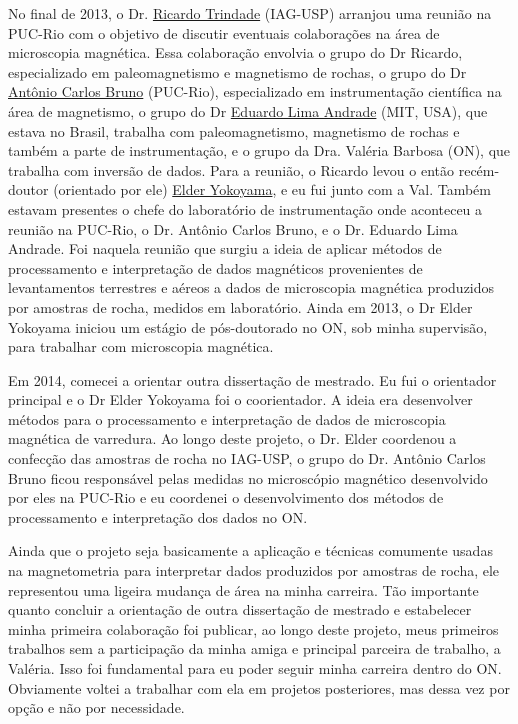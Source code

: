 No final de 2013, o Dr. \href{https://lattes.cnpq.br/3934334115083849}{Ricardo Trindade} (IAG-USP) arranjou uma reunião na
PUC-Rio com o objetivo de discutir eventuais colaborações na área de microscopia
magnética. Essa colaboração envolvia o grupo do Dr Ricardo, especializado em
paleomagnetismo e magnetismo de rochas, o grupo do Dr \href{https://lattes.cnpq.br/8840926029509231}{Antônio Carlos Bruno}
(PUC-Rio), especializado em instrumentação científica na área de magnetismo,
o grupo do Dr \href{https://eapsweb.mit.edu/people/limaea}{Eduardo Lima Andrade} (MIT, USA), que estava no Brasil, trabalha com paleomagnetismo,
magnetismo de rochas e também a parte de instrumentação, e o grupo da Dra. Valéria
Barbosa (ON), que trabalha com inversão de dados.
Para a reunião, o Ricardo levou o então recém-doutor (orientado por ele)
\href{https://lattes.cnpq.br/9806242954314478}{Elder Yokoyama}, e eu fui junto com a 
Val. Também estavam presentes o chefe
do laboratório de instrumentação onde aconteceu a reunião na PUC-Rio, o Dr.
Antônio Carlos Bruno, e o Dr. Eduardo Lima Andrade.
Foi naquela reunião que surgiu a ideia de aplicar métodos de processamento e
interpretação de dados magnéticos provenientes de levantamentos terrestres e 
aéreos a dados de microscopia magnética produzidos por amostras de rocha,
medidos em laboratório.
Ainda em 2013, o Dr Elder Yokoyama iniciou um estágio de pós-doutorado no ON,
sob minha supervisão, para trabalhar com microscopia magnética.

Em 2014, comecei a orientar outra dissertação de mestrado. 
Eu fui o orientador principal e o Dr Elder Yokoyama foi o coorientador. 
A ideia era desenvolver métodos para o processamento e interpretação 
de dados de microscopia magnética de varredura. Ao longo deste projeto, o Dr. Elder
coordenou a confecção das amostras de rocha no IAG-USP, o grupo do Dr. Antônio Carlos Bruno
ficou responsável pelas medidas no microscópio magnético desenvolvido por eles na PUC-Rio 
e eu coordenei o desenvolvimento dos métodos de processamento e interpretação dos dados
no ON.

Ainda que o projeto seja basicamente a aplicação e técnicas comumente usadas na 
magnetometria para interpretar dados produzidos por amostras de rocha, ele representou 
uma ligeira mudança de área na minha carreira. Tão importante quanto concluir a 
orientação de outra dissertação de mestrado e estabelecer minha primeira colaboração foi 
publicar, ao longo deste projeto, meus primeiros trabalhos sem a participação da 
minha amiga e principal parceira de trabalho, a Valéria. Isso foi fundamental para 
eu poder seguir minha carreira dentro do ON. Obviamente voltei a 
trabalhar com ela em projetos posteriores, mas dessa vez por opção e não por necessidade.

